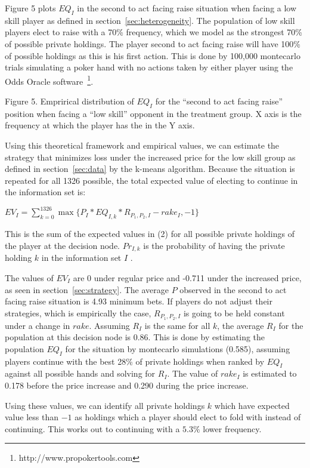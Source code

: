 \documentclass[12pt]{article}
\begin{document}
Figure 5 plots $EQ_I$ in the second to act facing raise situation when facing a low skill player as defined in section~\ref{sec:heterogeneity}. The population of low skill players elect to raise with a 70\% frequency, which we model as the strongest 70\% of possible private holdings. The player second to act facing raise will have 100\% of possible holdings as this is his first action. This is done by 100,000 montecarlo trials simulating a poker hand with no actions taken by either player using the Odds Oracle software~\footnote{http://www.propokertools.com}.

Figure 5. Emprirical distribution of $EQ_I$ for the “second to act facing raise” position when facing a “low skill” opponent in the treatment group. X axis is the frequency at which the player has the  in the Y axis.

Using this theoretical framework and empirical values, we can estimate the  strategy that minimizes loss under the increased price for the low skill group as defined in section~\ref{sec:data} by the k-means algorithm. Because the situation is repeated for all 1326 possible, the total expected value of electing to continue in the information set is:

$EV_{I} = \sum_{k=0}^{1326} \max\{P_I * EQ_{I, k} * R_{P_1, P_2, I} - rake_I, -1\} $

This is the sum of the expected values in (2) for all possible private holdings of the player at the decision node. $Pr_{I, k}$  is the probability of having the private holding $k$ in the information set $I$ . 

The values of $EV_{I}$ are 0 under regular price and -0.711 under the increased price, as seen in section~\ref{sec:strategy}. The average $P$ observed in the second to act facing raise situation is 4.93 minimum bets. If players do not adjust their strategies, which is empirically the case, $R_{P_1, P_2, I}$  is going to be held constant under a change in $rake$. Assuming $R_{I}$ is the same for all $k$, the average $R_{I}$ for the population at this decision node is 0.86. This is done by estimating the population $EQ_{I}$ for the situation by montecarlo simulations (0.585), assuming players continue with the best 28\% of private holdings when ranked by $EQ_{I}$ against all possible hands and solving for $R_{I}$. The value of $rake_{I}$ is estimated to 0.178 before the price increase and 0.290 during the price increase.

Using these values, we can identify all private holdings $k$  which have expected value less than $-1$ as holdings which a player should elect to fold with instead of continuing. This works out to 
continuing with a $5.3\%$ lower frequency.
\end{document}
